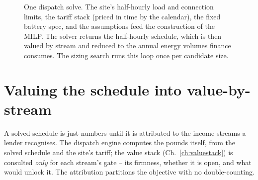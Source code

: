 \begin{figure}[H]
{}
\caption{One dispatch solve. The site's half-hourly load and connection limits, the tariff stack (priced in time by the calendar), the fixed battery spec, and the assumptions feed the construction of the MILP. The solver returns the half-hourly schedule, which is then valued by stream and reduced to the annual energy volumes finance consumes. The sizing search runs this loop once per candidate size.}
\label{fig:dispatch}
\end{figure}

\section{Valuing the schedule into value-by-stream}

A solved schedule is just numbers until it is attributed to the income streams a lender recognises. The dispatch engine computes the pounds itself, from the solved schedule and the site's tariff; the value stack (Ch.~\ref{ch:valuestack}) is consulted \emph{only} for each stream's gate -- its firmness, whether it is open, and what would unlock it. The attribution partitions the objective with no double-counting.

